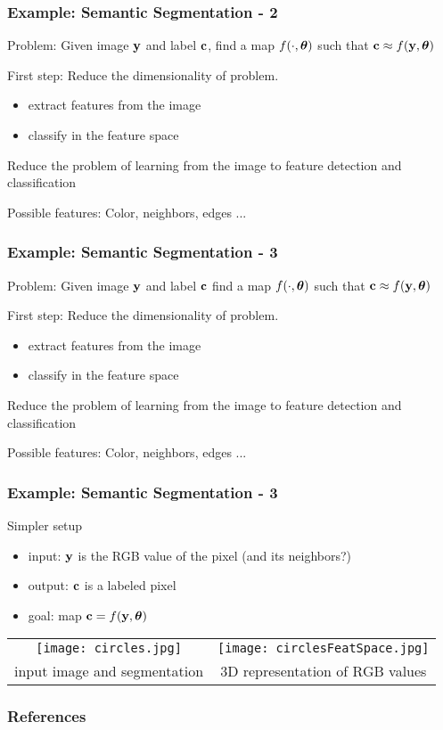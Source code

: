 \documentclass[12pt,fleqn]{beamer}
\begin{document}
\begin{frame}\frametitle{Example: Semantic Segmentation - 2}

Problem: Given image ${\bf y}$ and label ${\bf c}$, find a map $f(\cdot,{\boldsymbol \theta})$ such that ${\bf c}  \approx f({\bf y},{\boldsymbol \theta})$ 

\bigskip
\pause

First step: Reduce the dimensionality of problem.
\begin{itemize}
\item extract features from the image
\item classify in the feature space
\end{itemize}

Reduce the problem of learning from the image to feature
detection and classification

\pause
\bigskip

Possible features: Color, neighbors, edges ...

\bigskip


\end{frame}
\begin{frame}\frametitle{Example: Semantic Segmentation - 3}

Problem: Given image ${\bf y}$ and label ${\bf c}$ find a map $f(\cdot,{\boldsymbol \theta})$ such that ${\bf c}  \approx f({\bf y},{\boldsymbol \theta})$ 

\bigskip
\pause

First step: Reduce the dimensionality of problem.
\begin{itemize}
\item extract features from the image
\item classify in the feature space
\end{itemize}

Reduce the problem of learning from the image to feature
detection and classification

\pause
\bigskip

Possible features: Color, neighbors, edges ...

\bigskip


\end{frame}


\begin{frame}\frametitle{Example: Semantic Segmentation - 3}


Simpler setup
\begin{itemize}
\item input: ${\bf y}$ is the RGB value of the pixel (and its neighbors?)  
\item output: ${\bf c}$ is a labeled pixel
\item goal:  map ${\bf c}  = f({\bf y},{\boldsymbol \theta})$ 
\end{itemize}

\begin{tabular}{cc}
\texttt{[image: circles.jpg]} &
\texttt{[image: circlesFeatSpace.jpg]} \\
input image and segmentation & 3D representation of RGB values \\
\end{tabular}

\end{frame}


\begin{frame}[allowframebreaks]
	\frametitle{References}
 


\end{frame}
\end{document}
